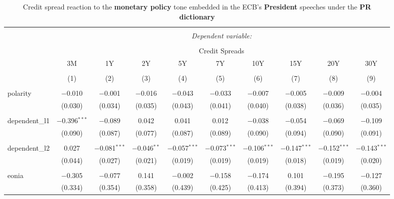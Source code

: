 
\begin{table}[!htbp] \centering 
  \caption[PR Monetary Policy Tone \& Credit Spread: president speeches]{Credit spread reaction to the \textbf{monetary policy} tone embedded in the ECB's \textbf{President} speeches under the \textbf{PR dictionary}} 
  \label{tab:spreads_president_pr_mp} 
  \begin{adjustbox}{width=1.25\textwidth}
\begin{tabular}{@{\extracolsep{5pt}}lccccccccc} 
\\[-1.8ex]\hline 
\hline \\[-1.8ex] 
 & \multicolumn{9}{c}{\textit{Dependent variable:}} \\ 
\cline{2-10} 
\\[-1.8ex] & \multicolumn{9}{c}{Credit Spreads} \\ 
 & 3M & 1Y & 2Y & 5Y & 7Y & 10Y & 15Y & 20Y & 30Y \\ 
\\[-1.8ex] & (1) & (2) & (3) & (4) & (5) & (6) & (7) & (8) & (9)\\ 
\hline \\[-1.8ex] 
 polarity & $-$0.010 & $-$0.001 & $-$0.016 & $-$0.043 & $-$0.033 & $-$0.007 & $-$0.005 & $-$0.009 & $-$0.004 \\ 
  & (0.030) & (0.034) & (0.035) & (0.043) & (0.041) & (0.040) & (0.038) & (0.036) & (0.035) \\ 
  & & & & & & & & & \\ 
 dependent\_l1 & $-$0.396$^{***}$ & $-$0.089 & 0.042 & 0.041 & 0.012 & $-$0.038 & $-$0.054 & $-$0.069 & $-$0.109 \\ 
  & (0.090) & (0.087) & (0.077) & (0.087) & (0.089) & (0.090) & (0.094) & (0.090) & (0.091) \\ 
  & & & & & & & & & \\ 
 dependent\_l2 & 0.027 & $-$0.081$^{***}$ & $-$0.046$^{**}$ & $-$0.057$^{***}$ & $-$0.073$^{***}$ & $-$0.106$^{***}$ & $-$0.147$^{***}$ & $-$0.152$^{***}$ & $-$0.143$^{***}$ \\ 
  & (0.044) & (0.027) & (0.021) & (0.019) & (0.019) & (0.019) & (0.018) & (0.019) & (0.020) \\ 
  & & & & & & & & & \\ 
 eonia & $-$0.305 & $-$0.077 & 0.141 & $-$0.002 & $-$0.158 & $-$0.174 & 0.101 & $-$0.195 & $-$0.127 \\ 
  & (0.334) & (0.354) & (0.358) & (0.439) & (0.425) & (0.413) & (0.394) & (0.373) & (0.360) \\ 

\end{tabular}
\end{adjustbox}
\end{table}
